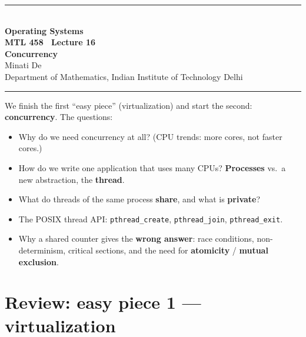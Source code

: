 \documentclass[11pt,a4paper]{article}
\begin{document}
\begin{center}
{\color{rulegray}\rule{\textwidth}{1.1pt}}\\[0.45em]
{\LARGE\bfseries Operating Systems}\\[0.25em]
{\Large\bfseries MTL 458 \textperiodcentered\ Lecture 16}\\[0.35em]
{\LARGE\bfseries Concurrency}\\[0.35em]
{\large Minati De}\\[0.15em]
{\normalsize Department of Mathematics, Indian Institute of Technology Delhi}\\[0.35em]
{\color{rulegray}\rule{\textwidth}{1.1pt}}
\end{center}

\vspace{0.4em}
\begin{keybox}
We finish the first ``easy piece'' (virtualization) and start the second:
\textbf{concurrency}. The questions:
\begin{itemize}
  \item Why do we need concurrency at all? (CPU trends: more cores, not
        faster cores.)
  \item How do we write one application that uses many CPUs?
        \textbf{Processes} vs.\ a new abstraction, the \textbf{thread}.
  \item What do threads of the same process \textbf{share}, and what is
        \textbf{private}?
  \item The POSIX thread API: \texttt{pthread\_create},
        \texttt{pthread\_join}, \texttt{pthread\_exit}.
  \item Why a shared counter gives the \textbf{wrong answer}: race
        conditions, non-determinism, critical sections, and the need for
        \textbf{atomicity} / \textbf{mutual exclusion}.
\end{itemize}
\end{keybox}

\tableofcontents
\vspace{0.6em}
\noindent{\color{rulegray}\rule{\textwidth}{0.4pt}}

\section{Review: easy piece 1 --- virtualization}
\end{document}
